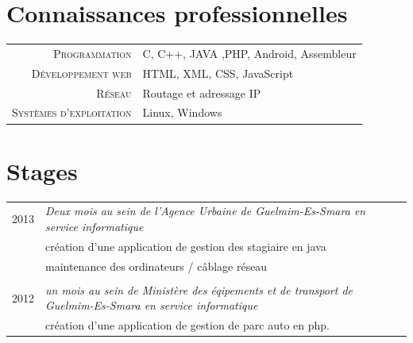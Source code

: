 \documentclass[a4paper,10pt]{article} %
\begin{document}

\section{Connaissances professionnelles}

\begin{tabular}{rl}
\textsc{Programmation} & C, C++, JAVA ,PHP, Android, Assembleur \\

\textsc{Développement web} & HTML, XML, CSS, JavaScript \\

\textsc{Réseau} & Routage et adressage IP \\
\textsc{Systèmes d'exploitation} & Linux, Windows \\ 
\end{tabular}





\section{Stages}

\begin{tabular}{r|p{11cm}}

\textsc{ 2013} & \emph{Deux mois au sein de l'Agence Urbaine de Guelmim-Es-Smara en service informatique}\\ 
& \footnotesize{création d'une application de gestion des stagiaire en java} \\
& \footnotesize{maintenance des ordinateurs / câblage réseau} \\
\multicolumn{2}{c}{} \\


\textsc{ 2012} & \emph{un mois au sein de Ministère des éqipements et de transport de Guelmim-Es-Smara en service informatique}\\ 
& \footnotesize{création d'une application de gestion de parc auto en php}.

\end{tabular}
\end{document}

